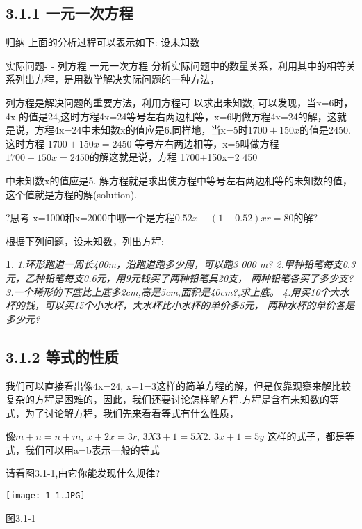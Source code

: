 \documentclass[11pt]{article}
\newtheorem{exercise}{ }
\begin{document}

\subsection*{3.1.1 一元一次方程}

归纳
上面的分析过程可以表示如下:
设未知数

实际问题- -
列方程
一元一次方程
分析实际问题中的数量关系，利用其中的相等关系列出方程，是用数学解决实际问题的一种方法，

列方程是解决问题的重要方法，利用方程可  以求出未知数,
可以发现，当x=6时，4x 的值是24,这时方程4x=24等号左右两边相等，x=6明做方程4x=24的解，这就是说，方程4x=24中未知数x的值应是6.同样地，当x=5时$1700+150x$的值是2450. 这时方程
$1700+150x=2450$
等号左右两边相等，x=5叫做方程$1700+150x=2450$的解这就是说，方程
1700+150x=2 450

中未知数x的值应是5.
解方程就是求出使方程中等号左右两边相等的未知数的值，这个值就是方程的解(solution).

?思考
x=1000和x=2000中哪一个是方程$0.52x- (1- 0. 52)xr= 80$的解?

根据下列问题，设未知数，列出方程:
\begin{exercise}
1.环形跑道一周长400m，沿跑道跑多少周，可以跑3 000 m?
2.甲种铅笔每支0.3元，乙种铅笔每支0.6元，用9元钱买了两种铅笔具20支，
两种铅笔各买了多少支?
3.一个稀形的下底比上底多2cm,高是5cm,面积是40cm?,求上底。
4.用买10个大水杯的钱，可以买15个小水杯，大水杯比小水杯的单价多5元，
两种水杯的单价各是多少元?
\end{exercise}


\subsection*{3.1.2 等式的性质}

我们可以直接看出像4x=24, x+1=3这样的简单方程的解，但是仅靠观察来解比较复杂的方程是困难的，因此，我们还要讨论怎样解方程.方程是含有未知数的等式，为了讨论解方程，我们先来看看等式有什么性质，

像$m+n=n+m$, $x+2x=3r$, $3X3+1=5X2$. $3x+1=5y$ 这样的式子，都是等式，我们可以用a=b表示一般的等式

请看图3.1-1,由它你能发现什么规律?
\begin{center}
  \texttt{[image: 1-1.JPG]}\\
\end{center}
图3.1-1
\end{document}
